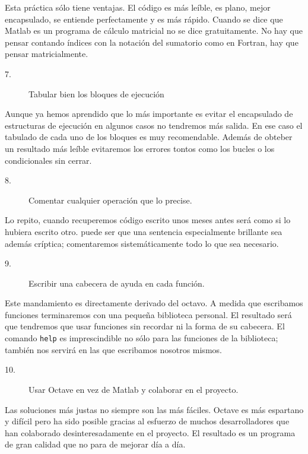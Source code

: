 Esta práctica sólo tiene ventajas. El código es más leíble, es plano,
mejor encapsulado, se entiende perfectamente y es más rápido. Cuando
se dice que Matlab es un programa de cálculo matricial no se dice
gratuitamente. No hay que pensar contando índices con la notación del
sumatorio como en Fortran, hay que pensar matricialmente.

\begin{description}
\item [7.]Tabular bien los bloques de ejecución
\end{description}
Aunque ya hemos aprendido que lo más importante es evitar el
encapsulado de estructuras de ejecución en algunos casos no tendremos
más salida.  En ese caso el tabulado de cada uno de los bloques es muy
recomendable.  Además de obteber un resultado más leíble evitaremos
los errores tontos como los bucles o los condicionales sin cerrar.

\begin{description}
\item [8.]Comentar cualquier operación que lo precise.
\end{description}
Lo repito, cuando recuperemos código escrito unos meses antes será
como si lo hubiera escrito otro. puede ser que una sentencia
especialmente brillante sea además críptica; comentaremos
sistemáticamente todo lo que sea necesario.

\begin{description}
\item [9.]Escribir una cabecera de ayuda en cada función.
\end{description}
Este mandamiento es directamente derivado del octavo. A medida que
escribamos funciones terminaremos con una pequeña biblioteca personal.
El resultado será que tendremos que usar funciones sin recordar ni la
forma de su cabecera. El comando \texttt{help} es imprescindible no
sólo para las funciones de la biblioteca; también nos servirá en las
que escribamos nosotros mismos.

\begin{description}
\item [10.]Usar Octave en vez de Matlab y colaborar en el proyecto.
\end{description}
Las soluciones más justas no siempre son las más fáciles. Octave es
más espartano y difícil pero ha sido posible gracias al esfuerzo de
muchos desarrolladores que han colaborado desinteresadamente en el
proyecto. El resultado es un programa de gran calidad que no para de
mejorar día a día.

